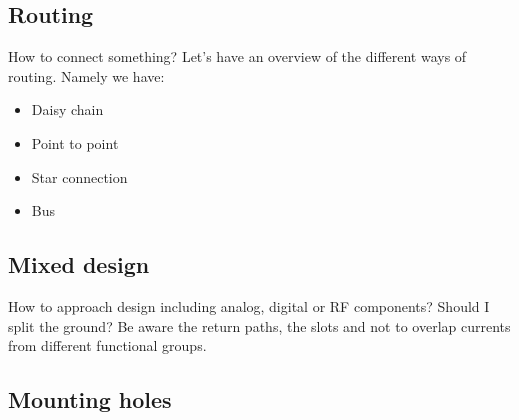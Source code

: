 \documentclass[final]{cubedoc}
\begin{document}
	\subsection{Routing}
	
	How to connect something? Let's have an overview of the different ways of routing. %
	Namely we have:
	
	\begin{itemize}
		\item Daisy chain
		\item Point to point
		\item Star connection
		\item Bus
	\end{itemize}
	
	\subsection{Mixed design}
	
	
	How to approach design including analog, digital or RF components? Should I split the ground? Be aware the return paths, the slots and not to overlap currents from different functional groups.
	
	
	
	\subsection{Mounting holes}
	
	
	
\end{document}
